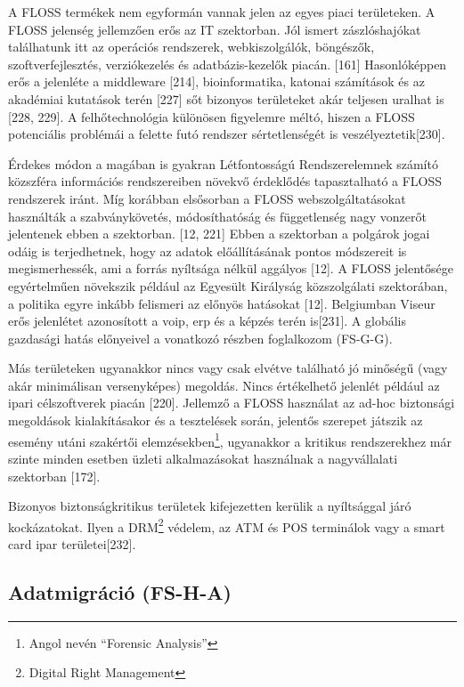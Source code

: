 \documentclass[12pt,magyar,a4paper,oneside]{scrreprt}
\begin{document}
A FLOSS termékek nem egyformán vannak jelen az egyes piaci területeken.
A FLOSS jelenség jellemzően erős az IT szektorban. Jól ismert
zászlóshajókat találhatunk itt az operációs rendszerek, webkiszolgálók,
böngészők, szoftverfejlesztés, verziókezelés és adatbázis-kezelők
piacán. {[}161{]} Hasonlóképpen erős a jelenléte a middleware {[}214{]},
bioinformatika, katonai számítások és az akadémiai kutatások terén
{[}227{]} sőt bizonyos területeket akár teljesen uralhat is {[}228,
229{]}. A felhőtechnológia különösen figyelemre méltó, hiszen a FLOSS
potenciális problémái a felette futó rendszer sértetlenségét is
veszélyeztetik{[}230{]}.

Érdekes módon a magában is gyakran Létfontosságú Rendszerelemnek számító
közszféra információs rendszereiben növekvő érdeklődés tapasztalható a
FLOSS rendszerek iránt. Míg korábban elsősorban a FLOSS
webszolgáltatásokat használták a szabványkövetés, módosíthatóság és
függetlenség nagy vonzerőt jelentenek ebben a szektorban. {[}12, 221{]}
Ebben a szektorban a polgárok jogai odáig is terjedhetnek, hogy az
adatok előállításának pontos módszereit is megismerhessék, ami a forrás
nyíltsága nélkül aggályos {[}12{]}. A FLOSS jelentősége egyértelműen
növekszik például az Egyesült Királyság közszolgálati szektorában, a
politika egyre inkább felismeri az előnyös hatásokat {[}12{]}.
Belgiumban Viseur erős jelenlétet azonosított a voip, erp és a képzés
terén is{[}231{]}. A globális gazdasági hatás előnyeivel a vonatkozó
részben foglalkozom (FS-G-G).

Más területeken ugyanakkor nincs vagy csak elvétve található jó minőségű
(vagy akár minimálisan versenyképes) megoldás. Nincs értékelhető
jelenlét például az ipari célszoftverek piacán {[}220{]}. Jellemző a
FLOSS használat az ad-hoc biztonsági megoldások kialakításakor és a
tesztelések során, jelentős szerepet játszik az esemény utáni szakértői
elemzésekben\footnote{Angol nevén ``Forensic Analysis''}, ugyanakkor a
kritikus rendszerekhez már szinte minden esetben üzleti alkalmazásokat
használnak a nagyvállalati szektorban {[}172{]}.

Bizonyos biztonságkritikus területek kifejezetten kerülik a nyíltsággal
járó kockázatokat. Ilyen a DRM\footnote{Digital Right Management}
védelem, az ATM és POS terminálok vagy a smart card ipar
területei{[}232{]}.

\hypertarget{sec:FS-H-A}{%
\subsection{Adatmigráció (FS-H-A)}\label{sec:FS-H-A}}
\end{document}

